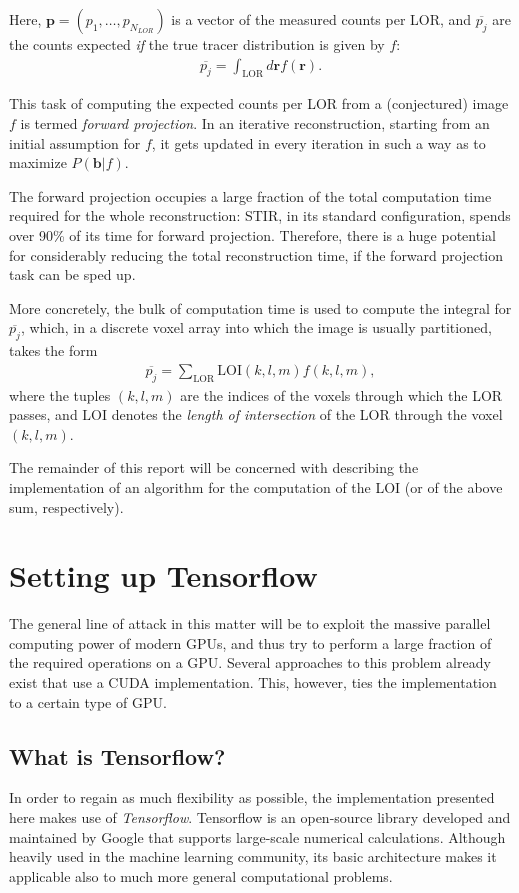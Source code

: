 \documentclass[a4paper, 11pt]{article}
\begin{document}
  Here, $\mathbf{p} = (p_1, \ldots, p_{N_{LOR}})$ is a vector of the measured counts per LOR, and $\overline{p_j}$ are the counts expected \textsl{if} the true tracer distribution is given by $f$:
  \begin{align}
    \overline{p_j} = \int_\text{LOR} d\mathbf{r} f(\mathbf{r}).
  \end{align}

  This task of computing the expected counts per LOR from a (conjectured) image $f$ is termed \textsl{forward projection}. In an iterative reconstruction, starting from an initial assumption for $f$, it gets updated in every iteration in such a way as to maximize $P(\mathbf{b} | f)$.

  The forward projection occupies a large fraction of the total computation time required for the whole reconstruction: STIR, in its standard configuration, spends over 90\% of its time for forward projection. Therefore, there is a huge potential for considerably reducing the total reconstruction time, if the forward projection task can be sped up.

  More concretely, the bulk of computation time is used to compute the integral for $\overline{p_j}$, which, in a discrete voxel array into which the image is usually partitioned, takes the form
  \begin{align}
     \overline{p_j} = \sum_\text{LOR} \text{LOI}(k, l, m) f(k, l, m),
     \label{LOR_discrete}
  \end{align}
  where the tuples $(k, l, m)$ are the indices of the voxels through which the LOR passes, and $\text{LOI}$ denotes the \textsl{length of intersection} of the LOR through the voxel $(k, l, m)$.

  The remainder of this report will be concerned with describing the implementation of an algorithm for the computation of the LOI (or of the above sum, respectively).

  \section{Setting up Tensorflow}
  The general line of attack in this matter will be to exploit the massive parallel computing power of modern GPUs, and thus try to perform a large fraction of the required operations on a GPU. Several approaches to this problem already exist that use a CUDA implementation. This, however, ties the implementation to a certain type of GPU.

  \subsection{What is Tensorflow?}
  In order to regain as much flexibility as possible, the implementation presented here makes use of \textsl{Tensorflow}. Tensorflow is an open-source library developed and maintained by Google that supports large-scale numerical calculations. Although heavily used in the machine learning community, its basic architecture makes it applicable also to much more general computational problems.
\end{document}
